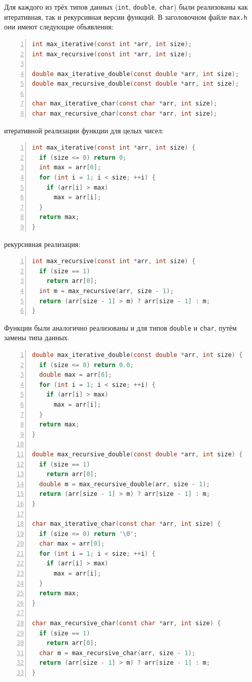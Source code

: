 Для каждого из трёх типов данных (\texttt{int}, \texttt{double}, \texttt{char}) были реализованы как итеративная, так и рекурсивная версии функций. В заголовочном файле \texttt{max.h} они имеют следующие объявления:

\begin{lstlisting}[language=C, numbers=left, caption=Заголовочный файл max.h]
int max_iterative(const int *arr, int size);
int max_recursive(const int *arr, int size);

double max_iterative_double(const double *arr, int size);
double max_recursive_double(const double *arr, int size);

char max_iterative_char(const char *arr, int size);
char max_recursive_char(const char *arr, int size);
\end{lstlisting}

 итеративной реализации функции для целых чисел:
\begin{lstlisting}[language=C, numbers=left, caption=Итеративная реализация max для int]
int max_iterative(const int *arr, int size) {
  if (size <= 0) return 0;
  int max = arr[0];
  for (int i = 1; i < size; ++i) {
    if (arr[i] > max)
      max = arr[i];
  }
  return max;
}
\end{lstlisting}

 рекурсивная реализация:
\begin{lstlisting}[language=C, numbers=left, caption=Рекурсивная реализация max для int]
int max_recursive(const int *arr, int size) {
  if (size == 1)
    return arr[0];
  int m = max_recursive(arr, size - 1);
  return (arr[size - 1] > m) ? arr[size - 1] : m;
}
\end{lstlisting}

Функции были аналогично реализованы и для типов \texttt{double} и \texttt{char}, путём замены типа данных.

\begin{lstlisting}[language=C, numbers=left, caption=Реализация max для double и char]
double max_iterative_double(const double *arr, int size) {
  if (size <= 0) return 0.0;
  double max = arr[0];
  for (int i = 1; i < size; ++i) {
    if (arr[i] > max)
      max = arr[i];
  }
  return max;
}

double max_recursive_double(const double *arr, int size) {
  if (size == 1)
    return arr[0];
  double m = max_recursive_double(arr, size - 1);
  return (arr[size - 1] > m) ? arr[size - 1] : m;
}

char max_iterative_char(const char *arr, int size) {
  if (size <= 0) return '\0';
  char max = arr[0];
  for (int i = 1; i < size; ++i) {
    if (arr[i] > max)
      max = arr[i];
  }
  return max;
}

char max_recursive_char(const char *arr, int size) {
  if (size == 1)
    return arr[0];
  char m = max_recursive_char(arr, size - 1);
  return (arr[size - 1] > m) ? arr[size - 1] : m;
}
\end{lstlisting}

